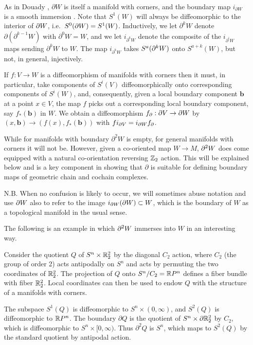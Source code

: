 As in Douady \cite{Doua61}, $\partial W$ is itself a manifold with corners, and the boundary map $i_{\partial W}$ is a smooth immersion \cite[Theorem 3.4]{Joy12}. Note that $S^1(W)$ will always be diffeomorphic to the interior of $\partial W$, i.e.\ $S^0(\partial W)=S^1(W)$.
Inductively, we let $\partial^k W$ denote $\partial (\partial^{k-1} W)$ with $\partial^0 W = W$, and we let $i_{\partial^k W}$ denote the composite of the $i_{\partial^i W}$ maps sending $\partial^k W$ to $W$. The map $i_{\partial^k W}$ takes $S^a(\partial^k W)$ onto $S^{a+k}(W)$, but not, in general, injectively.

\begin{remark}\label{R: bd diff}
If $f:V\to W$ is a diffeomorphism of manifolds with corners then it must, in particular, take components of $S^i(V)$ diffeomorphically onto corresponding components of $S^i(W)$, and, consequently, given a local boundary component $\mathbf{b}$ at a point $x\in V$, the map $f$ picks out a corresponding local boundary component, say $f_*(\mathbf{b})$ in $W$. We obtain a diffeomorphism $f_\partial:\partial V\to \partial W$ by $(x,\mathbf{b})\to (f(x),f_*(\mathbf{b}))$ with $fi_{\partial V}= i_{\partial W} f_\partial$.
\end{remark}

While for manifolds with boundary $\partial^2W$ is empty, for general manifolds with corners it will not be. However, given a co-oriented map $W\to M$, $\partial^2W$ does come equipped with a natural co-orientation reversing $\mathbb{Z}_2$ action. This will be explained below and is a key component in showing that $\partial$ is suitable for defining boundary maps of geometric chain and cochain complexes.

N.B. When no confusion is likely to occur, we will sometimes abuse notation and use $\partial W$ also to refer to the image $i_{\partial W}(\partial W)\subset W$, which is the boundary of $W$ as a topological manifold in the usual sense.


The following is an example in which $\partial^2 W$ immerses into $W$ in an interesting way.

\begin{example} \label{boundary}
Consider the quotient $Q$ of $S^n \times \mathbb{R}^2_2$ by the diagonal $C_2$ action, where $C_2$ (the group of order 2) acts antipodally on $S^n$ and acts by permuting the two coordinates
of $\mathbb{R}^2_2$.
The projection of $Q$ onto $S^n / C_2 = \mathbb{R} P^n$ defines a fiber bundle with fiber $\mathbb{R}^2_2$.
Local coordinates can then be used to endow $Q$ with the structure of a manifolds with corners.

The subspace $S^1(Q)$ is diffeomorphic to $S^n \times (0,\infty)$, and $S^2(Q)$ is diffeomorphic to $\mathbb{R} P^n$.
The boundary $\partial Q$ is the quotient of $S^n \times \partial \mathbb{R}^2_2$ by $C_2$, which is diffeomorphic to
$S^n \times [0,\infty)$.
Thus $\partial^2 Q$ is $S^n$, which maps to $S^2(Q)$ by the standard quotient by antipodal action.
\end{example}

